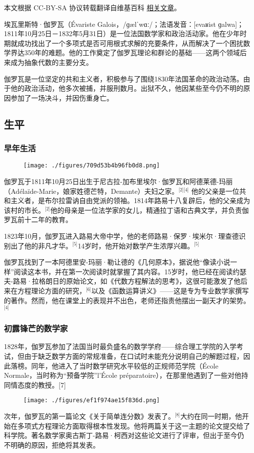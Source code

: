 
本文根据 CC-BY-SA 协议转载翻译自维基百科 \href{https://en.wikipedia.org/wiki/\%C3\%89variste_Galois}{相关文章}。

埃瓦里斯特·伽罗瓦（Évariste Galois，/ɡælˈwɑː/；法语发音：[evaʁist ɡalwa]；1811年10月25日－1832年5月31日）是一位法国数学家和政治活动家。他在少年时期就成功找出了一个多项式是否可用根式求解的充要条件，从而解决了一个困扰数学界达350年的难题。他的工作奠定了伽罗瓦理论和群论的基础——这两个领域后来成为抽象代数的主要分支。

伽罗瓦是一位坚定的共和主义者，积极参与了围绕1830年法国革命的政治动荡。由于他的政治活动，他多次被捕，并服刑数月。出狱不久，他因某些至今仍不明的原因参加了一场决斗，并因伤重身亡。
\subsection{生平}
\subsubsection{早年生活}
\begin{figure}[ht]
\centering
\texttt{[image: ./figures/709d53b4b96fb0d8.png]}
\caption{} \label{fig_AWLS_1}
\end{figure}
伽罗瓦于1811年10月25日出生于尼古拉-加布里埃尔·伽罗瓦和阿德莱德-玛丽（Adélaïde-Marie，娘家姓德芒特，Demante）夫妇之家。\(^\text{[2][4]}\) 他的父亲是一位共和主义者，是布尔拉雷讷自由党派的领袖。1814年路易十八复辟后，他的父亲成为该村的市长。\(^\text{[2]}\)他的母亲是一位法学家的女儿，精通拉丁语和古典文学，并负责伽罗瓦前十二年的教育。

1823年10月，伽罗瓦进入路易大帝中学，他的老师路易·保罗·埃米尔·理查德识别出了他的非凡才华。\(^\text{[5]}\)14岁时，他开始对数学产生浓厚兴趣。\(^\text{[5]}\)

伽罗瓦找到了一本阿德里安-玛丽·勒让德的《几何原本》，据说他“像读小说一样”阅读这本书，并在第一次阅读时就掌握了其内容。15岁时，他已经在阅读约瑟夫-路易·拉格朗日的原始论文，如《代数方程解法的思考》，这很可能激发了他后来在方程理论方面的研究，\(^\text{[6]}\)以及《函数运算讲义》——这是专为专业数学家撰写的著作。然而，他在课堂上的表现并不出色，老师还指责他摆出一副天才的架势。\(^\text{[4]}\)
\subsubsection{初露锋芒的数学家}
1828年，伽罗瓦参加了法国当时最负盛名的数学学府——综合理工学院的入学考试，但由于缺乏数学方面的常规准备，在口试时未能充分说明自己的解题过程，因此落榜。同年，他进入了当时数学研究水平较低的正规师范学院（École Normale，当时称为“预备学院”l’École préparatoire），在那里他遇到了一些对他持同情态度的教授。[7]
\begin{figure}[ht]
\centering
\texttt{[image: ./figures/ef1f974ae15f836d.png]}
\caption{} \label{fig_AWLS_2}
\end{figure}
次年，伽罗瓦的第一篇论文《关于简单连分数》发表了。\(^\text{[8]}\)大约在同一时期，他开始在多项式方程理论方面取得根本性发现。他将两篇关于这一主题的论文提交给了科学院。著名数学家奥古斯丁-路易·柯西对这些论文进行了评审，但出于至今仍不明确的原因，拒绝将其发表。

